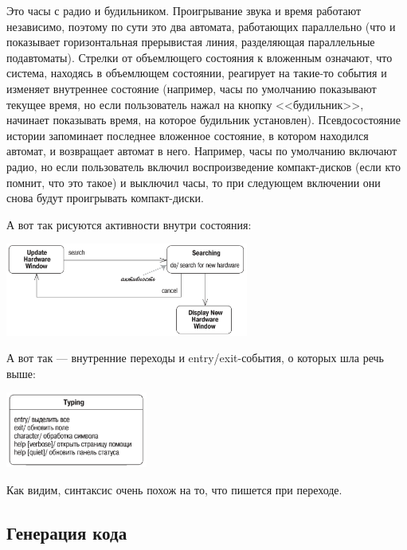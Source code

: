 \documentclass{../mcstext}
\begin{document}
Это часы с радио и будильником. Проигрывание звука и время работают независимо, поэтому по сути это два автомата, работающих параллельно (что и показывает горизонтальная прерывистая линия, разделяющая параллельные подавтоматы). Стрелки от объемлющего состояния к вложенным означают, что система, находясь в объемлющем состоянии, реагирует на такие-то события и изменяет внутреннее состояние (например, часы по умолчанию показывают текущее время, но если пользователь нажал на кнопку <<будильник>>, начинает показывать время, на которое будильник установлен). Псевдосостояние истории запоминает последнее вложенное состояние, в котором находился автомат, и возвращает автомат в него. Например, часы по умолчанию включают радио, но если пользователь включил воспроизведение компакт-дисков (если кто помнит, что это такое) и выключил часы, то при следующем включении они снова будут проигрывать компакт-диски.

А вот так рисуются активности внутри состояния:

\begin{center}
    \includegraphics[width=0.6\textwidth]{stateTransitionInternalEventExample.png}
\end{center}

А вот так --- внутренние переходы и entry/exit-события, о которых шла речь выше:

\begin{center}
    \includegraphics[width=0.35\textwidth]{stateTransitionInternalEvents.png}
\end{center}

Как видим, синтаксис очень похож на то, что пишется при переходе.

\subsection{Генерация кода}
\end{document}

